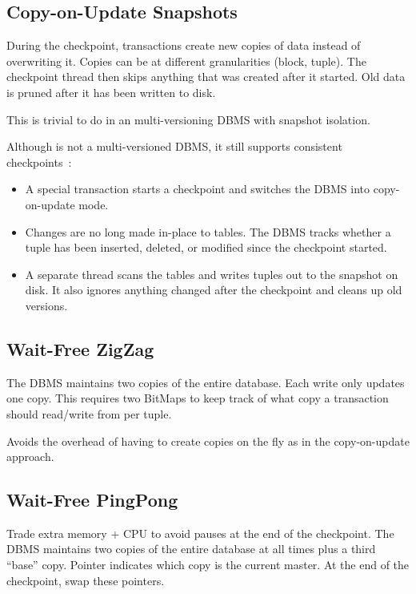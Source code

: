 \documentclass[11pt]{article}
\begin{document}
\subsection{Copy-on-Update Snapshots}
During the checkpoint, transactions create new copies of data instead of overwriting it.
Copies can be at different granularities (block, tuple).
The checkpoint thread then skips anything that was created after it started.
Old data is pruned after it has been written to disk.

This is trivial to do in an multi-versioning DBMS with snapshot isolation.

Although  is not a multi-versioned DBMS, it still supports consistent 
checkpoints~\cite{malviya-icde14}:
\begin{itemize}
    \item
    A special transaction starts a checkpoint and switches the DBMS into copy-on-update mode.
    
    
    \item
    Changes are no long made in-place to tables.
    The DBMS tracks whether a tuple has been inserted, deleted, or modified since the 
    checkpoint started.
    
    \item
    A separate thread scans the tables and writes tuples out to the snapshot on disk.
    It also ignores anything changed after the checkpoint and cleans up old versions.
\end{itemize}

\subsection{Wait-Free ZigZag}
The DBMS maintains two copies of the entire database. Each write only updates one copy.
This requires two BitMaps to keep track of what copy a transaction should read/write from per tuple.

Avoids the overhead of having to create copies on the fly as in the copy-on-update 
approach.

\subsection{Wait-Free PingPong}
Trade extra memory + CPU to avoid pauses at the end of the checkpoint.
The DBMS maintains two copies of the entire database at all times plus a third ``base'' copy.
Pointer indicates which copy is the current master.
At the end of the checkpoint, swap these pointers.
\end{document}
